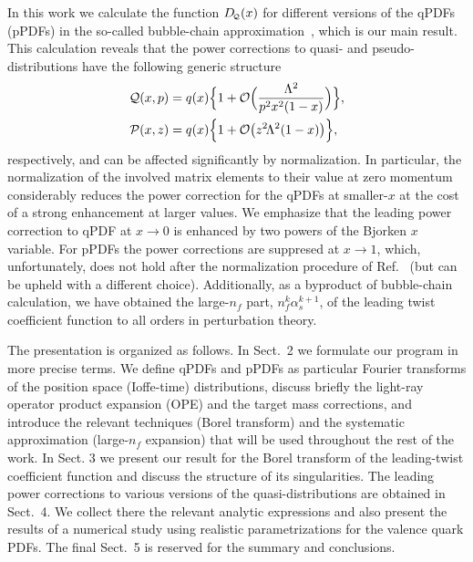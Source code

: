 In this work we calculate the function $D_{\!\scriptscriptstyle \mathcal{Q}}(x)$ for different versions of the qPDFs (pPDFs) in the so-called bubble-chain approximation~\cite{Beneke:1998ui}, which is our main result. This calculation reveals that the power corrections to quasi- and pseudo-distributions have the
following generic structure
\begin{align}
 \mathcal{Q} (x,p) &=  q(x) \Big\{1 + \mathcal{O}\Big( \frac{\Lambda^2}{p^2x^2(1-x)}\Big) \Big\},  
\notag\\
\mathcal{P}(x,z) &= q(x)\Big\{1 + \mathcal{O}\big( z^2\!\Lambda^2{(1-x)}\big)\Big\},
\end{align}
respectively, and can be affected significantly by normalization. In particular, the normalization of the involved matrix elements to their value at zero momentum considerably reduces the power correction for the qPDFs at smaller-$x$ at the cost of a strong enhancement at larger values. We emphasize that the leading power correction to qPDF at $x\to 0$  is enhanced by two powers of the Bjorken $x$ variable. For pPDFs the power corrections are suppresed at $x\to1$, which, unfortunately,  does not hold after the normalization procedure of Ref.~\cite{Orginos:2017kos} (but can be upheld with a different choice). Additionally, as a byproduct of bubble-chain calculation, we have obtained the large-$n_f$ part, $n^k_f \alpha_s^{k+1}$, of the
leading twist coefficient function to all orders in perturbation theory.   

    

The presentation is organized as follows. In Sect.~2 we formulate
our program in more precise terms. We define qPDFs and  pPDFs as 
particular Fourier transforms of the position space (Ioffe-time) distributions, 
discuss briefly the light-ray operator product expansion (OPE) and the target mass corrections, and  
introduce the relevant techniques (Borel transform) and the systematic approximation
(large-$n_f$ expansion) that will be used throughout the rest of
the work. In Sect. 3 we present our result for the Borel transform of the leading-twist
coefficient function and discuss the structure of its singularities. 
The leading power corrections to various versions of the quasi-distributions are obtained in Sect.~4. 
We collect there the relevant analytic expressions and also present the results of a numerical 
study using realistic parametrizations for the valence quark PDFs. 
The final Sect.~5 is reserved for the summary and conclusions.   


%
